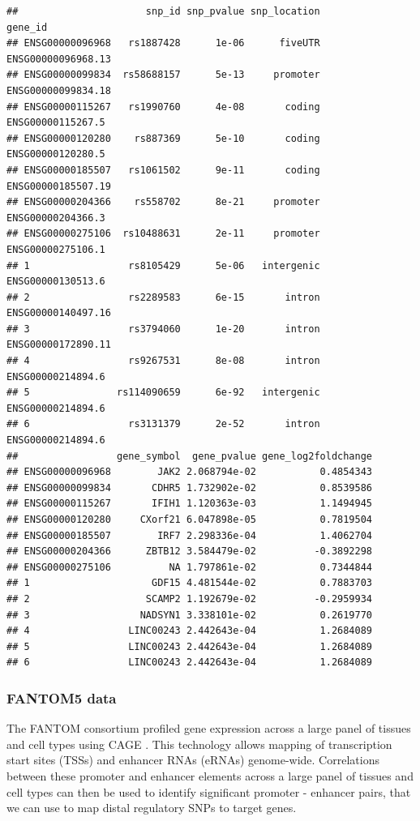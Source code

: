 \documentclass[9pt,a4paper,]{extarticle}
\begin{document}
\begin{verbatim}
##                      snp_id snp_pvalue snp_location            gene_id
## ENSG00000096968   rs1887428      1e-06      fiveUTR ENSG00000096968.13
## ENSG00000099834  rs58688157      5e-13     promoter ENSG00000099834.18
## ENSG00000115267   rs1990760      4e-08       coding  ENSG00000115267.5
## ENSG00000120280    rs887369      5e-10       coding  ENSG00000120280.5
## ENSG00000185507   rs1061502      9e-11       coding ENSG00000185507.19
## ENSG00000204366    rs558702      8e-21     promoter  ENSG00000204366.3
## ENSG00000275106  rs10488631      2e-11     promoter  ENSG00000275106.1
## 1                 rs8105429      5e-06   intergenic  ENSG00000130513.6
## 2                 rs2289583      6e-15       intron ENSG00000140497.16
## 3                 rs3794060      1e-20       intron ENSG00000172890.11
## 4                 rs9267531      8e-08       intron  ENSG00000214894.6
## 5               rs114090659      6e-92   intergenic  ENSG00000214894.6
## 6                 rs3131379      2e-52       intron  ENSG00000214894.6
##                 gene_symbol  gene_pvalue gene_log2foldchange
## ENSG00000096968        JAK2 2.068794e-02           0.4854343
## ENSG00000099834       CDHR5 1.732902e-02           0.8539586
## ENSG00000115267       IFIH1 1.120363e-03           1.1494945
## ENSG00000120280     CXorf21 6.047898e-05           0.7819504
## ENSG00000185507        IRF7 2.298336e-04           1.4062704
## ENSG00000204366      ZBTB12 3.584479e-02          -0.3892298
## ENSG00000275106          NA 1.797861e-02           0.7344844
## 1                     GDF15 4.481544e-02           0.7883703
## 2                    SCAMP2 1.192679e-02          -0.2959934
## 3                   NADSYN1 3.338101e-02           0.2619770
## 4                 LINC00243 2.442643e-04           1.2684089
## 5                 LINC00243 2.442643e-04           1.2684089
## 6                 LINC00243 2.442643e-04           1.2684089
\end{verbatim}

\subsubsection{FANTOM5 data}\label{fantom5-data}

The FANTOM consortium profiled gene expression across a large panel of tissues and cell types using CAGE \citep{Fantom2014, Andersson2014}.
This technology allows mapping of transcription start sites (TSSs) and enhancer RNAs (eRNAs) genome-wide.
Correlations between these promoter and enhancer elements across a large panel of tissues and cell types can then be used to identify significant promoter - enhancer pairs, that we can use to map distal regulatory SNPs to target genes.
\end{document}
